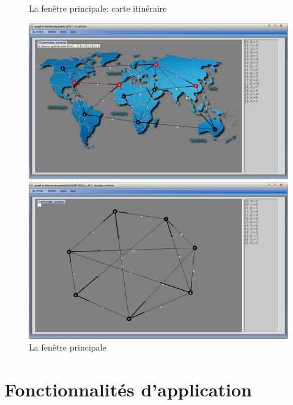 \documentclass[11pt,twoside,a4paper]{article}
\begin{document}
\begin{figure}[!h]
\begin{center}
\caption{La fenêtre principale: carte itinéraire}
\includegraphics{ecranPrincipal.png}
\caption{La fenêtre principale}
\includegraphics{ecranPrincipal2.png}
\end{center}
\end{figure}
\newpage

\section{Fonctionnalités d’application}
\end{document}
